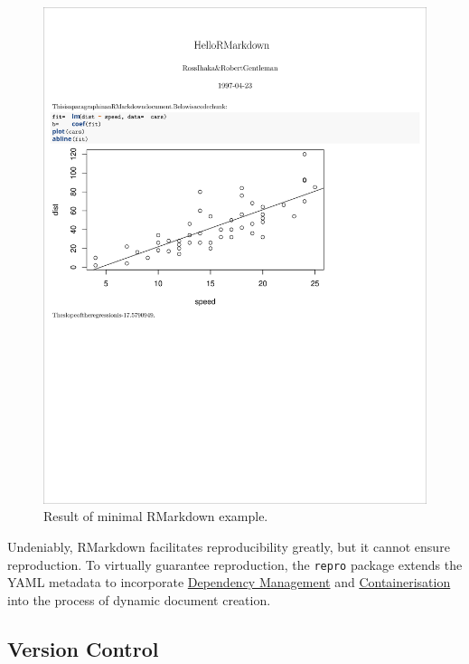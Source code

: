 \documentclass[12pt,a4paper,twoside]{article}
\begin{document}
\begin{figure}

{\centering \includegraphics[width=1\linewidth]{images/rmarkdown} 

}

\caption{Result of minimal RMarkdown example.}\label{fig:rmarkdown}
\end{figure}

Undeniably, RMarkdown facilitates reproducibility greatly, but it cannot ensure reproduction. To virtually guarantee reproduction, the \texttt{repro} package extends the YAML metadata to incorporate \protect\hyperlink{dependency-management}{Dependency Management} and \protect\hyperlink{containerisation}{Containerisation} into the process of dynamic document creation.

\hypertarget{version-control}{%
\subsection{Version Control}\label{version-control}}
\end{document}
